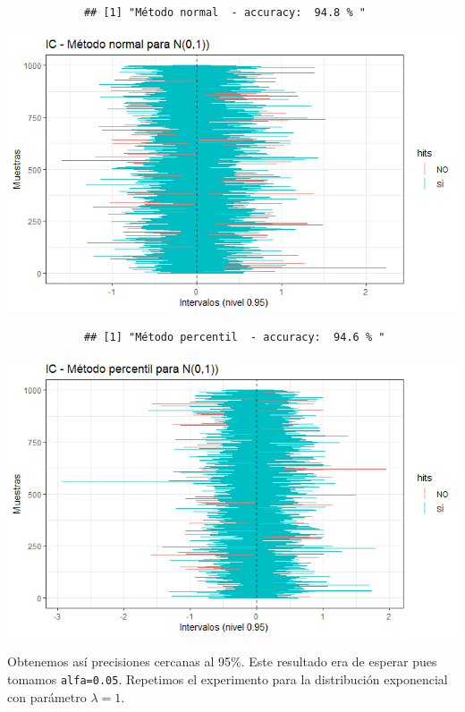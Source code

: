 \documentclass[a4paper]{article}
\begin{document}
		\begin{verbatim}
			## [1] "Método normal  - accuracy:  94.8 % "
		\end{verbatim}
		
		\includegraphics{figures/norm2.png}
		
		\begin{verbatim}
			## [1] "Método percentil  - accuracy:  94.6 % "
		\end{verbatim}
		
		\includegraphics{figures/norm3.png}
		
		Obtenemos así precisiones cercanas al 95\%. Este resultado era de
		esperar pues tomamos \texttt{alfa=0.05}. Repetimos el experimento para
		la distribución exponencial con parámetro \(\lambda=1\).
		
		\begin{Shaded}
			\begin{Highlighting}[]
\StringTok{ }\NormalTok{(}\NormalTok{, }\NormalTok{, }\NormalTok{)}
\NormalTok{(}
\NormalTok{\}}
			\end{Highlighting}
		\end{Shaded}
		
\end{document}

